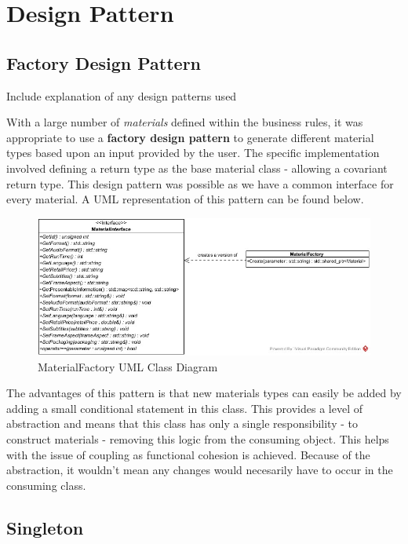 \documentclass[
  english,
  a4paper,
,tablecaptionabove
]{scrartcl}
\begin{document}
\newpage

\hypertarget{design-pattern}{%
\section{Design Pattern}\label{design-pattern}}

\hypertarget{factory-design-pattern}{%
\subsection{Factory Design Pattern}\label{factory-design-pattern}}

Include explanation of any design patterns used

With a large number of \emph{materials} defined within the business
rules, it was appropriate to use a \textbf{factory design pattern} to
generate different material types based upon an input provided by the
user. The specific implementation involved defining a return type as the
base material class - allowing a covariant return type. This design
pattern was possible as we have a common interface for every material. A
UML representation of this pattern can be found below.

\begin{figure}
\centering
\includegraphics{images/class-diagrams/material-factory.jpg}
\caption{MaterialFactory UML Class Diagram}
\end{figure}

The advantages of this pattern is that new materials types can easily be
added by adding a small conditional statement in this class. This
provides a level of abstraction and means that this class has only a
single responsibility - to construct materials - removing this logic
from the consuming object. This helps with the issue of coupling as
functional cohesion is achieved. Because of the abstraction, it wouldn't
mean any changes would necesarily have to occur in the consuming class.

\hypertarget{singleton}{%
\subsection{Singleton}\label{singleton}}
\end{document}
